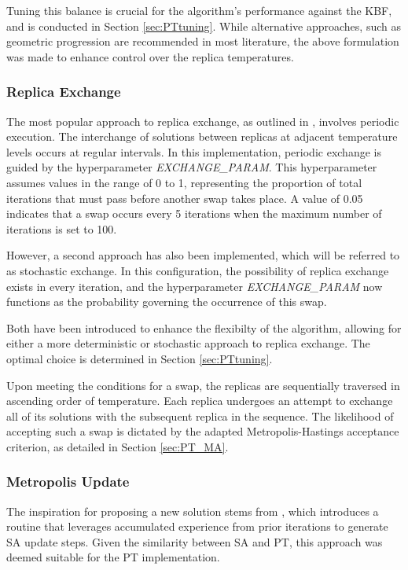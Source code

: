 \documentclass[10pt]{article}
\begin{document}
\begin{multicols}{2}
Tuning this balance is crucial for the algorithm's performance against the KBF, and is conducted in Section \ref{sec:PTtuning}. While alternative approaches, such as geometric progression \cite{Earl_2005} are recommended in most literature, the above formulation was made to enhance control over the replica temperatures.

\subsubsection{Replica Exchange}

The most popular approach to replica exchange, as outlined in \cite{Earl_2005}, involves periodic execution. The interchange of solutions between replicas at adjacent temperature levels occurs at regular intervals. In this implementation, periodic exchange is guided by the hyperparameter \textit{EXCHANGE\_PARAM}. This hyperparameter assumes values in the range of 0 to 1, representing the proportion of total iterations that must pass before another swap takes place. A value of 0.05 indicates that a swap occurs every 5 iterations when the maximum number of iterations is set to 100.

However, a second approach has also been implemented, which will be referred to as stochastic exchange. In this configuration, the possibility of replica exchange exists in every iteration, and the hyperparameter \textit{EXCHANGE\_PARAM} now functions as the probability governing the occurrence of this swap. 

Both have been introduced to enhance the flexibilty of the algorithm, allowing for either a more deterministic or stochastic approach to replica exchange. The optimal choice is determined in Section \ref{sec:PTtuning}.

Upon meeting the conditions for a swap, the replicas are sequentially traversed in ascending order of temperature. Each replica undergoes an attempt to exchange all of its solutions with the subsequent replica in the sequence. The likelihood of accepting such a swap is dictated by the adapted Metropolis-Hastings acceptance criterion, as detailed in Section \ref{sec:PT_MA}.

\subsubsection{Metropolis Update}
\label{sec:PT_update}

The inspiration for proposing a new solution stems from \cite{NT90-A34350}, which introduces a routine that leverages accumulated experience from prior iterations to generate SA update steps. Given the similarity between SA and PT, this approach was deemed suitable for the PT implementation.


\end{multicols}
\end{document}
